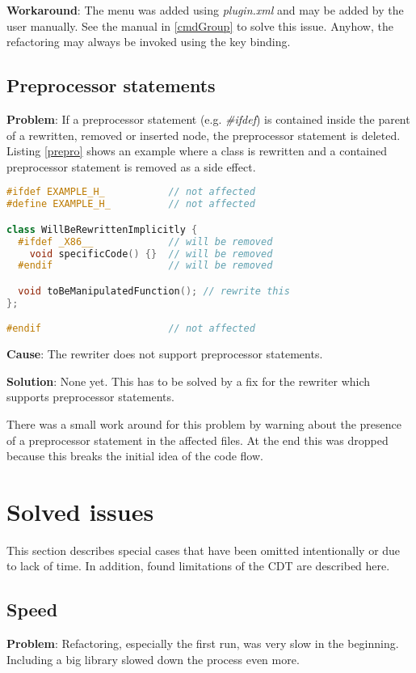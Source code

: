 \textbf{Workaround}: The menu was added using \textit{plugin.xml} and may be added 
by the user manually. See the manual in \ref{cmdGroup} to solve this issue. 
Anyhow, the refactoring may always be invoked using the key binding. 

\subsection{Preprocessor statements}
\textbf{Problem}: If a preprocessor statement (e.g. \textit{\#ifdef}) is
contained inside the parent of a rewritten, removed or inserted node, the
preprocessor statement is deleted. Listing \ref{prepro} shows an example where a
class is rewritten and a contained preprocessor statement is removed as a side
effect.

\begin{lstlisting}[caption={Jeopardized preprocessor statement inside a class
that is going to be rewritten}, label={prepro}, language=C++]
#ifdef EXAMPLE_H_           // not affected
#define EXAMPLE_H_          // not affected

class WillBeRewrittenImplicitly {
  #ifdef _X86__             // will be removed
    void specificCode() {}  // will be removed
  #endif                    // will be removed

  void toBeManipulatedFunction(); // rewrite this
};

#endif                      // not affected
\end{lstlisting}

\textbf{Cause}: The rewriter does not support preprocessor statements.

\textbf{Solution}: None yet. This has to be solved by a fix for the rewriter
which supports preprocessor statements.

There was a small work around for this problem by warning about the presence of
a preprocessor statement in the affected files. At the end this was dropped
because this breaks the initial idea of the code flow.

\section{Solved issues}

This section describes special cases that have been omitted intentionally or due 
to lack of time. In addition, found limitations of the CDT are described here.

\subsection{Speed}
\textbf{Problem}: Refactoring, especially the first run, was very slow in the 
beginning. Including a big library slowed down the process even more.

